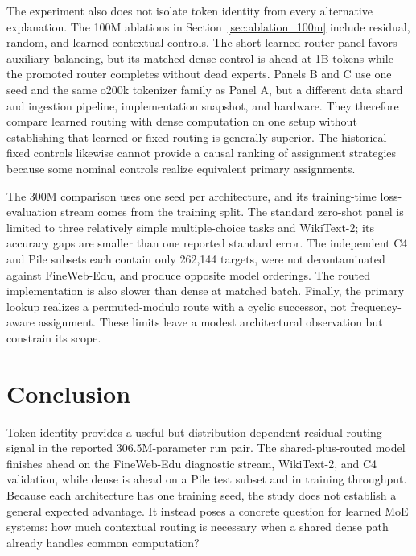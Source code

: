 \documentclass[10pt]{article}
\theoremstyle{definition}
\theoremstyle{remark}
\begin{document}
The experiment also does not isolate token identity from every alternative explanation. The 100M ablations in Section~\ref{sec:ablation_100m} include residual, random, and learned contextual controls. The short learned-router panel favors auxiliary balancing, but its matched dense control is ahead at 1B tokens while the promoted router completes without dead experts. Panels B and C use one seed and the same o200k tokenizer family as Panel A, but a different data shard and ingestion pipeline, implementation snapshot, and hardware. They therefore compare learned routing with dense computation on one setup without establishing that learned or fixed routing is generally superior. The historical fixed controls likewise cannot provide a causal ranking of assignment strategies because some nominal controls realize equivalent primary assignments.

The 300M comparison uses one seed per architecture, and its training-time loss-evaluation stream comes from the training split. The standard zero-shot panel is limited to three relatively simple multiple-choice tasks and WikiText-2; its accuracy gaps are smaller than one reported standard error. The independent C4 and Pile subsets each contain only 262,144 targets, were not decontaminated against FineWeb-Edu, and produce opposite model orderings. The routed implementation is also slower than dense at matched batch. Finally, the primary lookup realizes a permuted-modulo route with a cyclic successor, not frequency-aware assignment. These limits leave a modest architectural observation but constrain its scope.

\section{Conclusion}
\label{sec:conclusion}

Token identity provides a useful but distribution-dependent residual routing signal in the reported 306.5M-parameter run pair. The shared-plus-routed model finishes ahead on the FineWeb-Edu diagnostic stream, WikiText-2, and C4 validation, while dense is ahead on a Pile test subset and in training throughput. Because each architecture has one training seed, the study does not establish a general expected advantage. It instead poses a concrete question for learned MoE systems: how much contextual routing is necessary when a shared dense path already handles common computation?
\end{document}
